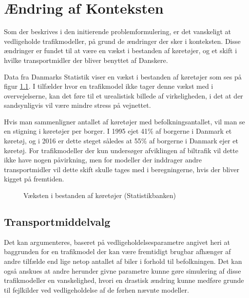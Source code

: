 \chapter{Ændring af Konteksten}\label{AenderingerAfKonteksten}
Som der beskrives i den initierende problemformulering, er det vanskeligt at vedligeholde trafikmodeller, på grund de ændringer der sker i konteksten. Disse ændringer er fundet til at være en vækst i bestanden af køretøjer, og et skift i hvilke transportmidler der bliver benyttet af Danskere.

\vspace{5mm}

Data fra Danmarks Statistik viser en vækst i bestanden af køretøjer som ses på figur \ref{plotvaekstbiler}. I tilfælder hvor en trafikmodel ikke tager denne vækst med i overvejelserne, kan det føre til et urealistisk billede af virkeligheden, i det at der sandsynligvis vil være mindre stress på vejnettet.

\vspace{5mm}

Hvis man sammenligner antallet af køretøjer med befolkningsantallet, vil man se en stigning i køretøjer per borger. I 1995 ejet 41\% af borgerne i Danmark et køretøj, og i 2016 er dette steget således at 55\% af borgerne i Danmark ejer et køretøj. For trafikmodeller der kun undersøger afviklingen af biltrafik vil dette ikke have nogen påvirkning, men for modeller der inddrager andre transportmidler vil dette skift skulle tages med i beregningerne, hvis der bliver kigget på fremtiden.

\begin{figure}[h!]
    
    \caption{Væksten i bestanden af køretøjer (Statistikbanken)}
    \label{plotvaekstbiler}
\end{figure}


\section{Transportmiddelvalg}
Det kan argumenteres, baseret på vedligeholdelsesparametre angivet heri at baggrunden for en trafikmodel der kan være fremtidigt brugbar afhænger af andre tilfælde end lige netop antallet af biler i forhold til befolkningen. Det kan også anskues at andre herunder givne parametre kunne gøre simulering af disse trafikmodeller en vanskelighed, hvori en drastisk ændring kunne medføre grunde til fejlkilder ved vedligeholdelse af de førhen nævnte modeller.

